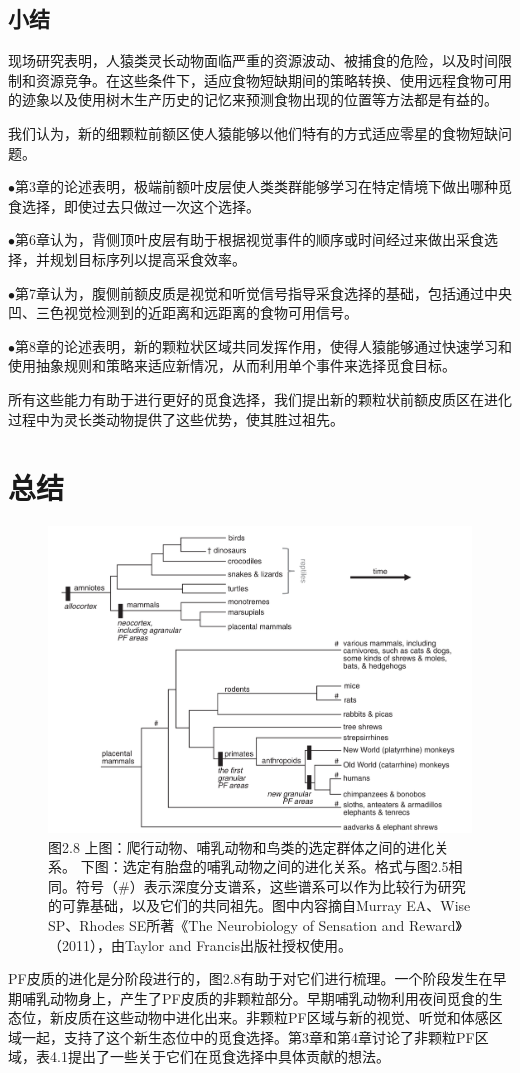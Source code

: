 \subsection{小结}
现场研究表明，人猿类灵长动物面临严重的资源波动、被捕食的危险，以及时间限制和资源竞争。在这些条件下，适应食物短缺期间的策略转换、使用远程食物可用的迹象以及使用树木生产历史的记忆来预测食物出现的位置等方法都是有益的。

我们认为，新的细颗粒前额区使人猿能够以他们特有的方式适应零星的食物短缺问题。\par
$\bullet$第3章的论述表明，极端前额叶皮层使人类类群能够学习在特定情境下做出哪种觅食选择，即使过去只做过一次这个选择。\par
$\bullet$第6章认为，背侧顶叶皮层有助于根据视觉事件的顺序或时间经过来做出采食选择，并规划目标序列以提高采食效率。\par
$\bullet$第7章认为，腹侧前额皮质是视觉和听觉信号指导采食选择的基础，包括通过中央凹、三色视觉检测到的近距离和远距离的食物可用信号。\par
$\bullet$第8章的论述表明，新的颗粒状区域共同发挥作用，使得人猿能够通过快速学习和使用抽象规则和策略来适应新情况，从而利用单个事件来选择觅食目标。

所有这些能力有助于进行更好的觅食选择，我们提出新的颗粒状前额皮质区在进化过程中为灵长类动物提供了这些优势，使其胜过祖先。

\section{总结}
\begin{figure}[!htb]
	\centering
	\includegraphics[width=0.8\linewidth]{image_pfc/Fig_2_8}
	\caption*{图2.8 上图：爬行动物、哺乳动物和鸟类的选定群体之间的进化关系。 下图：选定有胎盘的哺乳动物之间的进化关系。格式与图2.5相同。符号（\#）表示深度分支谱系，这些谱系可以作为比较行为研究的可靠基础，以及它们的共同祖先。图中内容摘自Murray EA、Wise SP、Rhodes SE所著《The Neurobiology of Sensation and Reward》（2011），由Taylor and Francis出版社授权使用。}
\end{figure}
PF皮质的进化是分阶段进行的，图2.8有助于对它们进行梳理。一个阶段发生在早期哺乳动物身上，产生了PF皮质的非颗粒部分。早期哺乳动物利用夜间觅食的生态位，新皮质在这些动物中进化出来。非颗粒PF区域与新的视觉、听觉和体感区域一起，支持了这个新生态位中的觅食选择。第3章和第4章讨论了非颗粒PF区域，表4.1提出了一些关于它们在觅食选择中具体贡献的想法。

